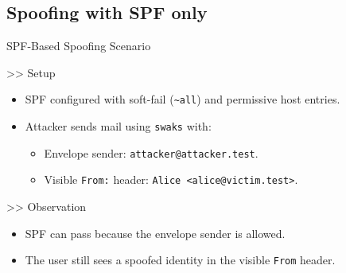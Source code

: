 \documentclass[aspectratio=169,10pt]{beamer}
\begin{document}
\subsection{Spoofing with SPF only}
\begin{frame}[fragile]{SPF-Based Spoofing Scenario}
  \transdissolve
  \begin{block}{>> Setup}
  \begin{itemize}
    \item SPF configured with soft-fail (\verb|~all|) and permissive host entries.
    \item Attacker sends mail using \texttt{swaks} with:
      \begin{itemize}
        \item Envelope sender: \texttt{attacker@attacker.test}.
        \item Visible \texttt{From:} header: \texttt{Alice <alice@victim.test>}.
      \end{itemize} \vspace{10pt}
  \end{itemize}
  \end{block}
  \vfill
  \begin{block}{>> Observation}
  \begin{itemize}
    \item SPF can pass because the envelope sender is allowed.
    \item The user still sees a spoofed identity in the visible \texttt{From} header.
  \end{itemize} \vspace{10pt}
  \end{block}
\end{frame}
\end{document}
